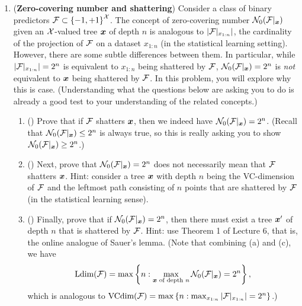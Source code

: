 \documentclass{article}
\begin{document}
\begin{enumerate}[leftmargin=*,align=left]
\begin{enumerate}[leftmargin=*,align=left]
\begin{enumerate}[leftmargin=*,align=left]
\end{enumerate}

\end{enumerate}

\newpage
\item
({\bf Zero-covering number and shattering})
Consider a class of binary predictors ${\mathcal{F}} \subset \left\{-1,+1\right\}^{\mathcal{X}}$.
The concept of zero-covering number ${\mathcal{N}}_0({\mathcal{F}}|_{\boldsymbol{x}})$ given an ${\mathcal{X}}$-valued tree ${\boldsymbol{x}}$ of depth $n$ is analogous to $|{\mathcal{F}}|_{x_{1:n}}|$, the cardinality of the projection of ${\mathcal{F}}$ on a dataset $x_{1:n}$ (in the statistical learning setting).
However, there are some subtle differences between them.
In particular, while $|{\mathcal{F}}|_{x_{1:n}}| = 2^n$ is equivalent to $x_{1:n}$ being shattered by ${\mathcal{F}}$, ${\mathcal{N}}_0({\mathcal{F}}|_{\boldsymbol{x}}) = 2^n$ is \textit{not} equivalent to ${\boldsymbol{x}}$ being shattered by ${\mathcal{F}}$.
In this problem, you will explore why this is case. 
(Understanding what the questions below are asking you to do is already a good test to your understanding of the related concepts.)

\begin{enumerate}[leftmargin=*,align=left]

\vspace{5pt}
\item () 
Prove that if ${\mathcal{F}}$ shatters ${\boldsymbol{x}}$, then we indeed have ${\mathcal{N}}_0({\mathcal{F}}|_{\boldsymbol{x}}) = 2^n$.
(Recall that ${\mathcal{N}}_0({\mathcal{F}}|_{\boldsymbol{x}}) \leq 2^n$ is always true, so this is really asking you to show ${\mathcal{N}}_0({\mathcal{F}}|_{\boldsymbol{x}}) \geq 2^n$.) \\

\vspace{5pt}
\item () 
Next, prove that ${\mathcal{N}}_0({\mathcal{F}}|_{\boldsymbol{x}}) = 2^n$ does not necessarily mean that ${\mathcal{F}}$ shatters ${\boldsymbol{x}}$. 
Hint: consider a tree ${\boldsymbol{x}}$ with depth $n$ being the VC-dimension of ${\mathcal{F}}$ and the leftmost path consisting of $n$ points that are shattered by ${\mathcal{F}}$ (in the statistical learning sense). \\


\vspace{5pt}
\item () 
Finally, prove that if ${\mathcal{N}}_0({\mathcal{F}}|_{\boldsymbol{x}}) = 2^n$, then there must exist a tree ${\boldsymbol{x}}'$ of depth $n$ that is shattered by ${\mathcal{F}}$. Hint: use Theorem 1 of Lecture 6, that is, the online analogue of Sauer's lemma. 
(Note that combining (a) and (c), we have 
\[
{\text{\rm Ldim}}({\mathcal{F}}) = \max\left\{n: \max_{{\boldsymbol{x}} \text{ of depth $n$}} {\mathcal{N}}_0({\mathcal{F}} |_{\boldsymbol{x}})=2^n\right\},
\] 
which is analogous to ${\text{\rm VCdim}}({\mathcal{F}}) = \max\left\{n: \max_{x_{1:n}} |{\mathcal{F}} |_{x_{1:n}}|=2^n\right\}$.) \\



\end{enumerate}
\end{enumerate}
\end{document}
